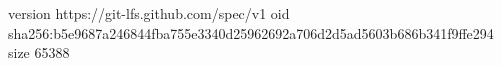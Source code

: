 version https://git-lfs.github.com/spec/v1
oid sha256:b5e9687a246844fba755e3340d25962692a706d2d5ad5603b686b341f9ffe294
size 65388
